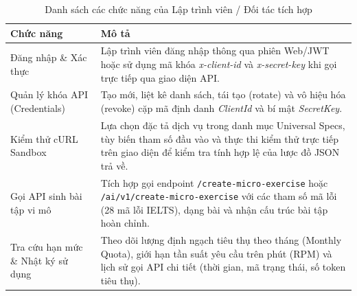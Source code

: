 \begin{table}[H]
\centering
\caption{Danh sách các chức năng của Lập trình viên / Đối tác tích hợp}
\label{aihub:tab:func_developer}
\small
\begin{tabular}{|p{4.2cm}|p{\dimexpr\linewidth-4.2cm-4\tabcolsep-3\arrayrulewidth\relax}|}
\hline
\textbf{Chức năng} & \textbf{Mô tả} \\ \hline
Đăng nhập \& Xác thực & Lập trình viên đăng nhập thông qua phiên Web/JWT hoặc sử dụng mã khóa \textit{x-client-id} và \textit{x-secret-key} khi gọi trực tiếp qua giao diện API. \\ \hline
Quản lý khóa API (Credentials) & Tạo mới, liệt kê danh sách, tái tạo (rotate) và vô hiệu hóa (revoke) cặp mã định danh \textit{ClientId} và bí mật \textit{SecretKey}. \\ \hline
Kiểm thử cURL Sandbox & Lựa chọn đặc tả dịch vụ trong danh mục Universal Specs, tùy biến tham số đầu vào và thực thi kiểm thử trực tiếp trên giao diện để kiểm tra tính hợp lệ của lược đồ JSON trả về. \\ \hline
Gọi API sinh bài tập vi mô & Tích hợp gọi endpoint \texttt{/create-micro-exercise} hoặc \texttt{/ai/v1/create-micro-exercise} với các tham số mã lỗi (28 mã lỗi IELTS), dạng bài và nhận cấu trúc bài tập hoàn chỉnh. \\ \hline
Tra cứu hạn mức \& Nhật ký sử dụng & Theo dõi lượng định ngạch tiêu thụ theo tháng (Monthly Quota), giới hạn tần suất yêu cầu trên phút (RPM) và lịch sử gọi API chi tiết (thời gian, mã trạng thái, số token tiêu thụ). \\ \hline
\end{tabular}
\end{table}

